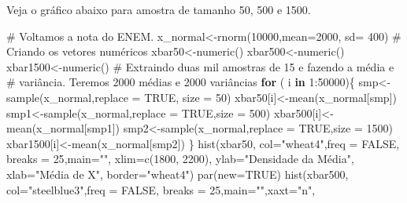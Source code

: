 \documentclass[
  letterpaper,
  DIV=11,
  numbers=noendperiod]{scrartcl}
\newenvironment{Shaded}{\begin{snugshade}}{\end{snugshade}}
\newcommand{\AttributeTok}[1]{\textcolor[rgb]{0.40,0.45,0.13}{#1}}
\newcommand{\CommentTok}[1]{\textcolor[rgb]{0.37,0.37,0.37}{#1}}
\newcommand{\ConstantTok}[1]{\textcolor[rgb]{0.56,0.35,0.01}{#1}}
\newcommand{\ControlFlowTok}[1]{\textcolor[rgb]{0.00,0.23,0.31}{\textbf{#1}}}
\newcommand{\DecValTok}[1]{\textcolor[rgb]{0.68,0.00,0.00}{#1}}
\newcommand{\FunctionTok}[1]{\textcolor[rgb]{0.28,0.35,0.67}{#1}}
\newcommand{\NormalTok}[1]{\textcolor[rgb]{0.00,0.23,0.31}{#1}}
\newcommand{\OtherTok}[1]{\textcolor[rgb]{0.00,0.23,0.31}{#1}}
\newcommand{\SpecialCharTok}[1]{\textcolor[rgb]{0.37,0.37,0.37}{#1}}
\newcommand{\StringTok}[1]{\textcolor[rgb]{0.13,0.47,0.30}{#1}}
\begin{document}
Veja o gráfico abaixo para amostra de tamanho 50, 500 e 1500.

\begin{Shaded}
\begin{Highlighting}[]
\CommentTok{\# Voltamos a nota do ENEM. }
\NormalTok{x\_normal}\OtherTok{\textless{}{-}}\FunctionTok{rnorm}\NormalTok{(}\DecValTok{10000}\NormalTok{,}\AttributeTok{mean=}\DecValTok{2000}\NormalTok{, }\AttributeTok{sd=} \DecValTok{400}\NormalTok{)}
\CommentTok{\# Criando os vetores numéricos }
\NormalTok{xbar50}\OtherTok{\textless{}{-}}\FunctionTok{numeric}\NormalTok{()}
\NormalTok{xbar500}\OtherTok{\textless{}{-}}\FunctionTok{numeric}\NormalTok{()}
\NormalTok{xbar1500}\OtherTok{\textless{}{-}}\FunctionTok{numeric}\NormalTok{()}
\CommentTok{\# Extraindo duas mil amostras de 15 e fazendo a média e }
\CommentTok{\# variância. Teremos 2000 médias e 2000 variâncias }
\ControlFlowTok{for}\NormalTok{ ( i }\ControlFlowTok{in} \DecValTok{1}\SpecialCharTok{:}\DecValTok{50000}\NormalTok{)\{}
\NormalTok{  smp}\OtherTok{\textless{}{-}}\FunctionTok{sample}\NormalTok{(x\_normal,}\AttributeTok{replace =} \ConstantTok{TRUE}\NormalTok{, }\AttributeTok{size =} \DecValTok{50}\NormalTok{)}
\NormalTok{  xbar50[i]}\OtherTok{\textless{}{-}}\FunctionTok{mean}\NormalTok{(x\_normal[smp])}
\NormalTok{  smp1}\OtherTok{\textless{}{-}}\FunctionTok{sample}\NormalTok{(x\_normal,}\AttributeTok{replace =} \ConstantTok{TRUE}\NormalTok{,}\AttributeTok{size =} \DecValTok{500}\NormalTok{)}
\NormalTok{  xbar500[i]}\OtherTok{\textless{}{-}}\FunctionTok{mean}\NormalTok{(x\_normal[smp1])}
\NormalTok{  smp2}\OtherTok{\textless{}{-}}\FunctionTok{sample}\NormalTok{(x\_normal,}\AttributeTok{replace =} \ConstantTok{TRUE}\NormalTok{,}\AttributeTok{size =} \DecValTok{1500}\NormalTok{)}
\NormalTok{  xbar1500[i]}\OtherTok{\textless{}{-}}\FunctionTok{mean}\NormalTok{(x\_normal[smp2])}
\NormalTok{\}}
\FunctionTok{hist}\NormalTok{(xbar50, }\AttributeTok{col=}\StringTok{"wheat4"}\NormalTok{,}\AttributeTok{freq =} \ConstantTok{FALSE}\NormalTok{, }\AttributeTok{breaks =} \DecValTok{25}\NormalTok{,}\AttributeTok{main=}\StringTok{""}\NormalTok{,}
     \AttributeTok{xlim=}\FunctionTok{c}\NormalTok{(}\DecValTok{1800}\NormalTok{, }\DecValTok{2200}\NormalTok{), }\AttributeTok{ylab=}\StringTok{"Densidade da Média"}\NormalTok{, }\AttributeTok{xlab=}\StringTok{"Média de X"}\NormalTok{, }
     \AttributeTok{border=}\StringTok{"wheat4"}\NormalTok{)}
\FunctionTok{par}\NormalTok{(}\AttributeTok{new=}\ConstantTok{TRUE}\NormalTok{)}
\FunctionTok{hist}\NormalTok{(xbar500, }\AttributeTok{col=}\StringTok{"steelblue3"}\NormalTok{,}\AttributeTok{freq =} \ConstantTok{FALSE}\NormalTok{, }\AttributeTok{breaks =} \DecValTok{25}\NormalTok{,}\AttributeTok{main=}\StringTok{""}\NormalTok{,}\AttributeTok{xaxt=}\StringTok{"n"}\NormalTok{,}

\end{Highlighting}
\end{Shaded}
\end{document}

